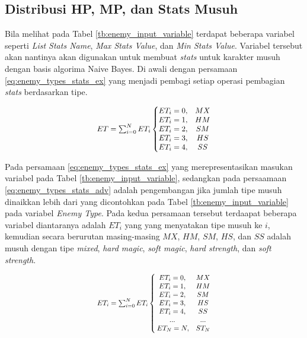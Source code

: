 \subsection{Distribusi HP, MP, dan Stats Musuh}
\label{sec:sub_sec3_enemy_hp_mp_stats}
\vspace{1ex}

Bila melihat pada Tabel \ref{tb:enemy_input_variable} terdapat beberapa variabel seperti \textit{List Stats Name}, \textit{Max Stats Value}, dan \textit{Min Stats Value}. Variabel tersebut akan nantinya akan digunakan untuk membuat \textit{stats} untuk karakter musuh dengan basis algorima Naive Bayes. Di awali dengan persamaan \ref{eq:enemy_types_stats_ex} yang menjadi pembagi setiap operasi pembagian \textit{stats} berdasarkan tipe.
\vspace{1ex}

\begin{equation}\label{eq:enemy_types_stats_ex}
\resizebox{0.4\textwidth}{!}{%
	$ET = \sum_{i= 0}^{N} ET_{i} \left\{\begin{matrix}
	ET_{i} = 0, & MX\\ 
	ET_{i} = 1, & HM\\ 
	ET_{i} = 2, & SM\\ 
	ET_{i} = 3, & HS\\
	ET_{i} = 4, & SS
	\end{matrix}\right.$%
}
\end{equation}

Pada persamaan \ref{eq:enemy_types_stats_ex} yang merepresentasikan masukan variabel pada Tabel \ref{tb:enemy_input_variable}, sedangkan pada persaamaan \ref{eq:enemy_types_stats_adv} adalah pengembangan jika jumlah tipe musuh dinaikkan lebih dari yang dicontohkan pada Tabel \ref{tb:enemy_input_variable} pada variabel \textit{Enemy Type}. Pada kedua persamaan tersebut terdaapat beberapa variabel diantaranya adalah $ET_{i}$ yang yang menyatakan tipe musuh ke $i$, kemudian secara berurutan masing-masing $MX$, $HM$, $SM$, $HS$, dan $SS$ adalah musuh dengan tipe \textit{mixed}, \textit{hard magic}, \textit{soft magic}, \textit{hard strength}, dan \textit{soft strength}.
\vspace{1ex}

\begin{equation}\label{eq:enemy_types_stats_adv}
\resizebox{0.4\textwidth}{!}{%
	$ET_{i} = \sum_{i= 0}^{N} ET_{i} \left\{\begin{matrix}
	ET_{i} = 0, & MX\\ 
	ET_{i} = 1, & HM\\ 
	ET_{i} = 2, & SM\\ 
	ET_{i} = 3, & HS\\ 
	ET_{i} = 4, & SS\\
	... & ... \\
	\hspace{0.2em} ET_{N} = N, & ST_{N}
	\end{matrix}\right.$%
}
\end{equation}

